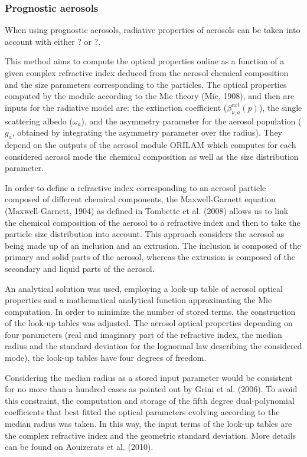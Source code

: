 \subsubsection{Prognostic aerosols}

When using prognostic aerosols, radiative properties of aerosols can be taken into account with either ? or ?.

This method aims to compute the optical properties online as a function of a given complex refractive index deduced from the aerosol chemical composition and the size parameters corresponding to the particles.
The optical properties computed by the module according to the Mie theory (Mie, 1908), and then are inputs for the radiative model are: the extinction coefficient ($\beta_{\nu,a}^{ext}(p)$), the single scattering albedo ($\omega_a$), and the asymmetry parameter for the aerosol population ($g_a$, obtained by integrating the asymmetry parameter over the radius). They depend on the outputs of the aerosol module ORILAM which computes for each considered aerosol mode the chemical composition as well as the size distribution parameter.

In order to define a refractive index corresponding to an aerosol particle composed of different chemical components, the Maxwell-Garnett equation (Maxwell-Garnett, 1904) as defined in Tombette et al. (2008) allows us to link the chemical composition of the aerosol to a refractive index and then to take the particle size  distribution into account. This approach considers the aerosol as being made up of an inclusion and an extrusion. The inclusion is composed of the primary and solid parts of the aerosol, whereas the extrusion is composed of the secondary and liquid parts of the aerosol.

An analytical solution was used, employing a look-up table of aerosol optical properties and a mathematical analytical function approximating the Mie computation. In order to minimize the number of stored terms, the construction of the look-up tables was adjusted. The aerosol optical properties depending on four parameters (real and imaginary part of the refractive index, the median radius and the standard deviation for the lognormal law describing the considered mode), the look-up tables have four degrees of freedom.

Considering the median radius as a stored input parameter would be consistent for no more than a hundred cases as pointed out by Grini et al. (2006). To avoid this constraint, the computation and storage of the fifth degree dual-polynomial coefficients that best fitted the optical parameters evolving according to the median radius was taken. In this way, the input terms of the look-up tables are the complex refractive index and the geometric standard deviation. More details can be found on Aouizerats et al. (2010).

